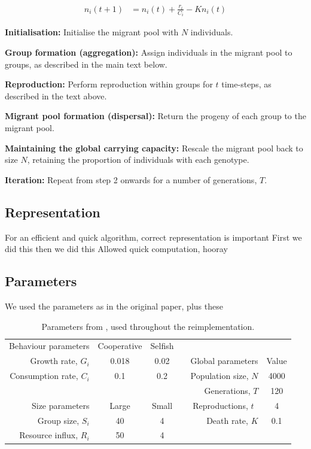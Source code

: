 \documentclass[11pt]{article}
\begin{document}
\begin{align} \label{eq:shares}
  n_i(t+1) &= n_i(t) + \frac{r_i}{C_i} - Kn_i(t)
\end{align}

\begin{compactenum}
\item\textbf{Initialisation:} Initialise the migrant pool with $N$ individuals.
\item\textbf{Group formation (aggregation):} Assign individuals in the migrant pool
to groups, as described in the main text below.
\item\textbf{Reproduction:} Perform reproduction within groups for $t$ time-steps, as
described in the text above.
\item\textbf{Migrant pool formation (dispersal):} Return the progeny of each group
to the migrant pool.
\item\textbf{Maintaining the global carrying capacity:} Rescale the migrant pool
back to size $N$, retaining the proportion of individuals with each genotype.
\item\textbf{Iteration:} Repeat from step 2 onwards for a number of generations, $T$.
\end{compactenum}

\subsection{Representation}
For an efficient and quick algorithm, correct representation is important
First we did this
then we did this
Allowed quick computation, hooray

\subsection{Parameters}
We used the parameters as in the original paper, plus these

\begin{table}[!ht]
  \centering
  \begin{tabular}{r|c|ccr|c}
  Behaviour parameters	& Cooperative	& Selfish	&  & \multicolumn{1}{c}{} & \\ \cline{1-3}
  Growth rate, $G_i$			& 0.018			& 0.02		&  & Global parameters	& Value\\ \cline{5-6}
  Consumption rate, $C_i$		& 0.1			& 0.2		&  & Population size, $N$	& 4000\\
  \multicolumn{1}{r}{} & \multicolumn{1}{c}{} & \multicolumn{1}{c}{} &  & Generations, $T$ & 120 \\
  Size parameters		& Large			& Small		&  & Reproductions, $t$~ 		& 4\\ \cline{1-3}
  Group size, $S_i$			& 40			& 4			&  & Death rate, $K$ & 0.1\\
  Resource influx, $R_i$		& 50			& 4			&  & \multicolumn{1}{c}{} & \\
  \end{tabular}
  \caption{Parameters from \cite{orig}, used throughout the reimplementation.}
  \label{table:param}
\end{table}
\end{document}
